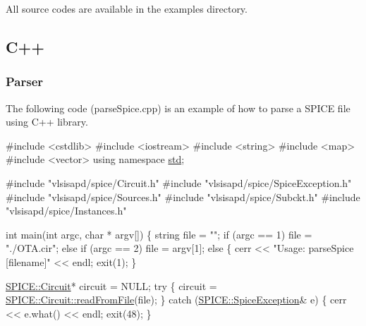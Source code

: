 All source codes are available in the {\ttfamily examples} directory.\hypertarget{spice_spiceC}{}\subsection{C++}\label{spice_spiceC}
\hypertarget{spice_spiceParseC}{}\subsubsection{Parser}\label{spice_spiceParseC}
The following code ({\ttfamily parse\+Spice.\+cpp}) is an example of how to parse a S\+P\+I\+CE file using C++ library. 
\begin{DoxyCodeInclude}
\textcolor{preprocessor}{#include <cstdlib>}
\textcolor{preprocessor}{#include <iostream>}
\textcolor{preprocessor}{#include <string>}
\textcolor{preprocessor}{#include <map>}
\textcolor{preprocessor}{#include <vector>}
\textcolor{keyword}{using namespace }\mbox{\hyperlink{namespacestd}{std}};

\textcolor{preprocessor}{#include "vlsisapd/spice/Circuit.h"}
\textcolor{preprocessor}{#include "vlsisapd/spice/SpiceException.h"}
\textcolor{preprocessor}{#include "vlsisapd/spice/Sources.h"}
\textcolor{preprocessor}{#include "vlsisapd/spice/Subckt.h"}
\textcolor{preprocessor}{#include "vlsisapd/spice/Instances.h"}

\textcolor{keywordtype}{int} main(\textcolor{keywordtype}{int} argc, \textcolor{keywordtype}{char} * argv[]) \{
    \textcolor{keywordtype}{string} file = \textcolor{stringliteral}{""};
    \textcolor{keywordflow}{if} (argc == 1)
        file = \textcolor{stringliteral}{"./OTA.cir"};
    \textcolor{keywordflow}{else} \textcolor{keywordflow}{if} (argc == 2)
        file = argv[1];
    \textcolor{keywordflow}{else} \{
        cerr << \textcolor{stringliteral}{"Usage: parseSpice [filename]"} << endl;
        exit(1);
    \}

    \mbox{\hyperlink{class_s_p_i_c_e_1_1_circuit}{SPICE::Circuit}}* circuit = NULL;
    \textcolor{keywordflow}{try} \{
        circuit = \mbox{\hyperlink{class_s_p_i_c_e_1_1_circuit_aa8294fe7d9ceddb5653d08ecae3eaf36}{SPICE::Circuit::readFromFile}}(file);
    \} \textcolor{keywordflow}{catch} (\mbox{\hyperlink{class_s_p_i_c_e_1_1_spice_exception}{SPICE::SpiceException}}& e) \{
        cerr << e.what() << endl;
        exit(48);
    \}


\end{DoxyCodeInclude}
